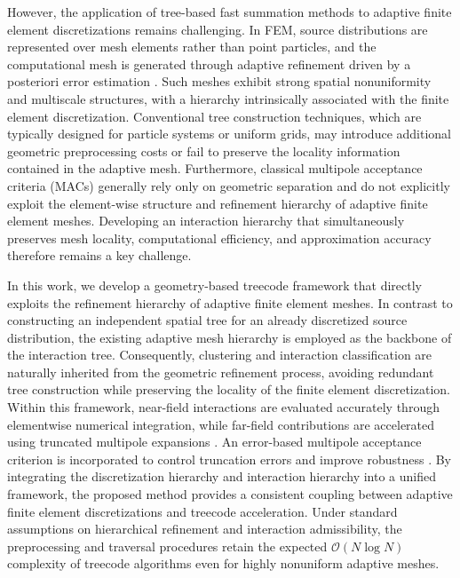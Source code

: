 \documentclass[a4paper,10pt]{article}
\begin{document}
However, the application of tree-based fast summation methods to adaptive finite element discretizations remains challenging. In FEM, source distributions are represented over mesh elements rather than point particles, and the computational mesh is generated through adaptive refinement driven by a posteriori error estimation
\cite{Verfurth1996,Binev2004}. Such meshes exhibit strong spatial nonuniformity and multiscale structures, with a hierarchy intrinsically associated with the finite element discretization. Conventional tree construction techniques, which are typically designed for particle systems or uniform grids, may introduce additional geometric preprocessing costs or fail to preserve the locality information contained in the adaptive mesh. Furthermore, classical multipole acceptance criteria (MACs) generally rely only on geometric separation and do not explicitly exploit the element-wise structure and refinement hierarchy of adaptive finite element meshes. Developing an interaction hierarchy that simultaneously preserves mesh locality, computational efficiency, and approximation accuracy therefore remains a key challenge.

In this work, we develop a geometry-based treecode framework that directly exploits the refinement hierarchy of adaptive finite element meshes. In contrast to constructing an independent spatial tree for an already discretized source distribution, the existing adaptive mesh hierarchy is employed as the backbone of the interaction tree. Consequently, clustering and interaction classification are naturally inherited from the geometric refinement process, avoiding redundant tree construction while preserving the locality of the finite element discretization. Within this framework, near-field interactions are evaluated accurately through elementwise numerical integration, while far-field contributions are accelerated using truncated multipole expansions
\cite{Greengard1987}. An error-based multipole acceptance criterion is incorporated to control truncation errors and improve robustness
\cite{Barnes1986}. By integrating the discretization hierarchy and interaction hierarchy into a unified framework, the proposed method provides a consistent coupling between adaptive finite element discretizations and treecode acceleration. Under standard assumptions on hierarchical refinement and interaction admissibility, the preprocessing and traversal procedures retain the expected $\mathcal{O}(N\log N)$ complexity of treecode algorithms even for highly nonuniform adaptive meshes.
\end{document}
